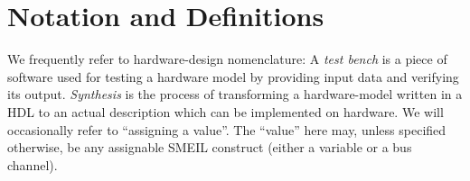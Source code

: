 \section{Notation and Definitions}
We frequently refer to hardware-design nomenclature: A {\itshape test bench} is
a piece of software used for testing a hardware model by providing input data
and verifying its output. {\itshape Synthesis} is the process of transforming a
hardware-model written in a HDL to an actual description which can be
implemented on hardware. We will occasionally refer to ``assigning a
value''. The ``value'' here may, unless specified otherwise, be any assignable
SMEIL construct (either a variable or a bus channel).







